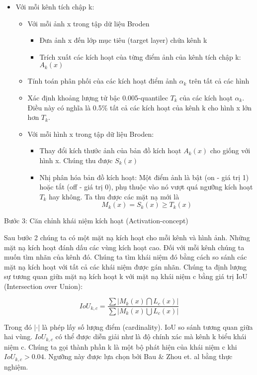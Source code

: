 \begin{itemize}
    \item Với mỗi kênh tích chập k:
    \begin{itemize}
        \item Với mỗi ảnh x trong tập dữ liệu Broden
        \begin{itemize}
            \item Đưa ảnh x đến lớp mục tiêu (target layer) chứa kênh k
            \item Trích xuất các kích hoạt của từng điểm ảnh của kênh tích chập k: $A_k(x)$
        \end{itemize}
        \item Tính toán phân phối của các kích hoạt điểm ảnh $\alpha_k$ trên tất cả các hình
        \item Xác định khoảng lượng tử bậc 0.005-quantilec $T_k$ của các kích hoạt $\alpha_k$. Điều này có nghĩa là 0.5$\%$ tất cả các kích hoạt của kênh k cho hình x lớn hơn $T_k$.
        \item Với mỗi hình x trong tập dữ liệu Broden:
        \begin{itemize}
            \item Thay đổi kích thước ảnh của bản đồ kích hoạt $A_k(x)$ cho giống với hình x. Chúng thu được $S_k(x)$
            \item Nhị phân hóa bản đồ kích hoạt: Một điểm ảnh là bật (on - giá trị 1) hoặc tắt (off - giá trị 0), phụ thuộc vào nó vượt quá ngưỡng kích hoạt $T_k$ hay không. Ta thu được các mặt nạ mới là \[M_k(x)=S_k(x)\geq{}T_k(x)\]
        \end{itemize}
    \end{itemize}
\end{itemize}


Bước 3: Căn chỉnh khái niệm kích hoạt (Activation-concept)
\newline

Sau bước 2 chúng ta có một mặt nạ kích hoạt cho mỗi kênh và hình ảnh. Những mặt nạ kích hoạt đánh dấu các vùng kích hoạt cao. Đối với mỗi kênh chúng ta muốn tìm nhãn của kênh đó. Chúng ta tìm khái niệm đó bằng cách so sánh các mặt nạ kích hoạt với tất cả các khái niệm được  gán nhãn. Chúng ta định lượng sự tương quan giữa mặt nạ kích hoạt k với mặt nạ khái niệm c bằng giá trị IoU (Intersection over Union):

\[IoU_{k,c}=\frac{\sum|M_k(x)\bigcap{}L_c(x)|}{\sum|M_k(x)\bigcup{}L_c(x)|}\]

Trong đó $|\cdot|$ là phép lấy số lượng điểm (cardinality). IoU so sánh tương quan giữa hai vùng. $IoU_{k,c}$ có thể được diễn giải như là độ chính xác mà kênh k biểu khái niệm c. Chúng ta gọi thành phần k là một bộ phát hiện của khái niệm c khi $IoU_{k,c}>0.04$. Ngưỡng này được lựa chọn bởi Bau $\&$ Zhou et. al bằng thực nghiệm.

